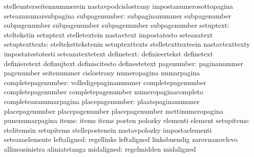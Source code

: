                                   stelleunterseitennummerein       nastavpodcislostrany
                                  impostanumerosottopagina         seteazanumarsubpagina
subpagenumber: subpaginanummer              subpagenumber
               subpagenumber                subpagenumber
               subpagenumber                subpagenumber
                       setuptext: steltekstin                      setuptext
                                  stelletextein                    nastavtext
                                  impostatesto                     seteazatext
                  setuptexttexts: stelteksttekstenin               setuptexttexts
                                  stelletexttexteein               nastavtexttexty
                                  impostatestotesti                seteazatextetext
                      definetext: definieertekst                   definetext
                                  definieretext                    definujtext
                                  definiscitesto                   definestetext
                      pagenumber: paginanummer                     pagenumber
                                  seitenummer                      cislostrany
                                  numeropagina                     numarpagina
              completepagenumber: volledigepaginanummer            completepagenumber
                                  completepagenumber               completepagenumber %
                                  numeropaginacompleto             completeazanumarpagina %
                 placepagenumber: plaatspaginanummer               placepagenumber
                                  placepagenumber                  placepagenumber %
                                  mettinumeropagina                punenumarpagina %
                           items: items                            items
                                  posten                           polozky
                                  elementi                         element
                      setupitems: stelitemsin                      setupitems
                                  stellepostenein                  nastavpolozky
                                  impostaelementi                  seteazaelemente
                     leftaligned: regellinks                       leftaligned
                                  linksbuendig                     zarovnanovlevo
                                  allineasinistra                  aliniatstanga
                      midaligned: regelmidden                      midaligned
